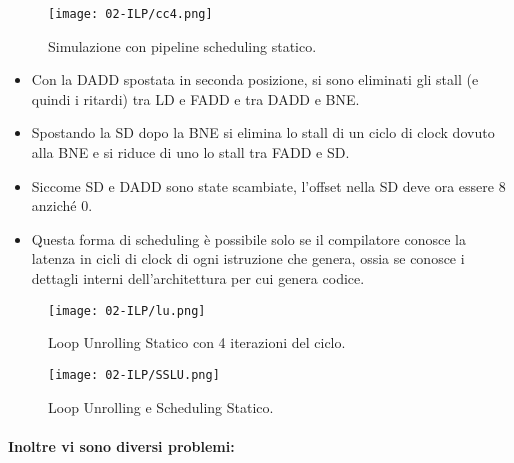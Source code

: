 
\begin{figure}[!h]
    \centering
    \texttt{[image: 02-ILP/cc4.png]}
    \caption{Simulazione con pipeline scheduling statico.}
\end{figure}



\begin{itemize}
  \item Con la DADD spostata in seconda posizione, si sono eliminati gli
stall (e quindi i ritardi) tra LD e FADD e tra DADD e BNE. 
\item Spostando la SD dopo la BNE si elimina lo stall di un ciclo di
clock dovuto alla BNE e si riduce di uno lo stall tra FADD e SD. 
\item Siccome SD e DADD sono state scambiate, l’offset nella SD deve
ora essere 8 anziché 0. 
\item Questa forma di scheduling è possibile solo se il
compilatore conosce la latenza in cicli di clock di ogni istruzione
che genera, ossia se conosce i dettagli interni dell’architettura per
cui genera codice.
\end{itemize}


\begin{figure}[!h]
    \centering
    \texttt{[image: 02-ILP/lu.png]}
    \caption{Loop Unrolling Statico con 4 iterazioni del ciclo.}
\end{figure}


\begin{figure}[!h]
    \centering
    \texttt{[image: 02-ILP/SSLU.png]}
    \caption{Loop Unrolling e Scheduling Statico.}
\end{figure}


\paragraph{Inoltre vi sono diversi problemi:}

